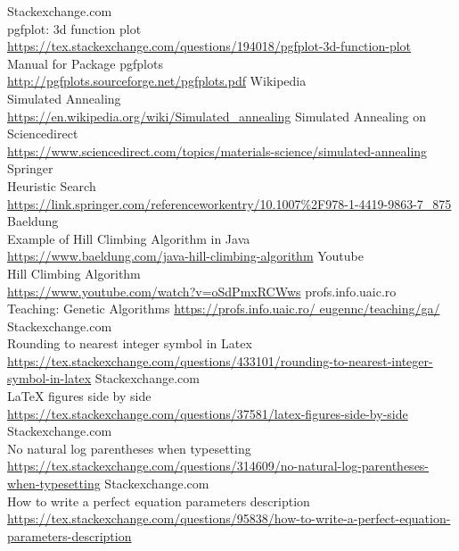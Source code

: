 \documentclass{article}
\begin{document}
\begin{thebibliography}{9}
        Stackexchange.com \\ pgfplot: 3d function plot \\
        \url{https://tex.stackexchange.com/questions/194018/pgfplot-3d-function-plot}\\
        Manual for Package pgfplots \\
        \url{http://pgfplots.sourceforge.net/pgfplots.pdf}
        Wikipedia \\ Simulated Annealing \\
        \url{https://en.wikipedia.org/wiki/Simulated_annealing}
        Simulated Annealing on Sciencedirect \\
        \url{https://www.sciencedirect.com/topics/materials-science/simulated-annealing}
        Springer \\ Heuristic Search \\
        \url{https://link.springer.com/referenceworkentry/10.1007%2F978-1-4419-9863-7_875}
        Baeldung \\ Example of Hill Climbing Algorithm in Java \\
        \url{https://www.baeldung.com/java-hill-climbing-algorithm}
        Youtube \\ Hill Climbing Algorithm \\
        \url{https://www.youtube.com/watch?v=oSdPmxRCWws}
        profs.info.uaic.ro \\ Teaching: Genetic Algorithms
        \url{https://profs.info.uaic.ro/ eugennc/teaching/ga/}
        Stackexchange.com \\ Rounding to nearest integer symbol in Latex \\
        \url{https://tex.stackexchange.com/questions/433101/rounding-to-nearest-integer-symbol-in-latex}
        Stackexchange.com \\ LaTeX figures side by side \\
        \url{https://tex.stackexchange.com/questions/37581/latex-figures-side-by-side}
        Stackexchange.com \\ No natural log parentheses when typesetting\\
        \url{https://tex.stackexchange.com/questions/314609/no-natural-log-parentheses-when-typesetting}
        Stackexchange.com \\ How to write a perfect equation parameters description\\
        \url{https://tex.stackexchange.com/questions/95838/how-to-write-a-perfect-equation-parameters-description}

\end{thebibliography}
\end{document}
